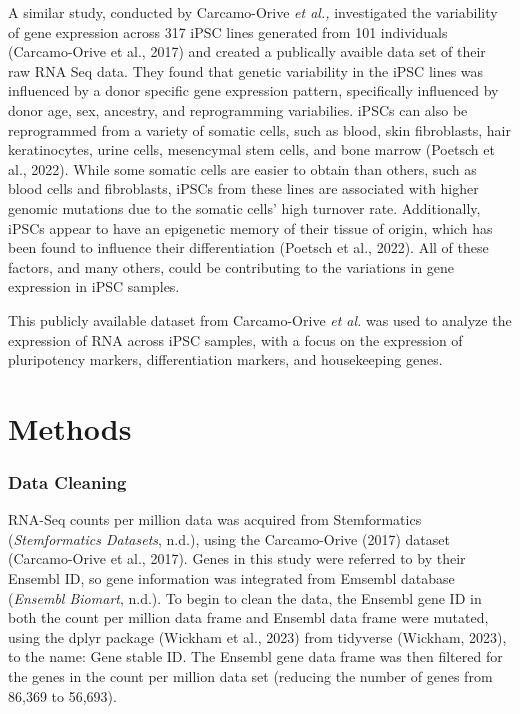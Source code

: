 \documentclass[
  letterpaper,
  DIV=11,
  numbers=noendperiod]{scrartcl}
\begin{document}
A similar study, conducted by Carcamo-Orive \emph{et al.,} investigated
the variability of gene expression across 317 iPSC lines generated from
101 individuals (Carcamo-Orive et al., 2017) and created a publically
avaible data set of their raw RNA Seq data. They found that genetic
variability in the iPSC lines was influenced by a donor specific gene
expression pattern, specifically influenced by donor age, sex, ancestry,
and reprogramming variabilies. iPSCs can also be reprogrammed from a
variety of somatic cells, such as blood, skin fibroblasts, hair
keratinocytes, urine cells, mesencymal stem cells, and bone marrow
(Poetsch et al., 2022). While some somatic cells are easier to obtain
than others, such as blood cells and fibroblasts, iPSCs from these lines
are associated with higher genomic mutations due to the somatic cells'
high turnover rate. Additionally, iPSCs appear to have an epigenetic
memory of their tissue of origin, which has been found to influence
their differentiation (Poetsch et al., 2022). All of these factors, and
many others, could be contributing to the variations in gene expression
in iPSC samples.

This publicly available dataset from Carcamo-Orive \emph{et al.} was
used to analyze the expression of RNA across iPSC samples, with a focus
on the expression of pluripotency markers, differentiation markers, and
housekeeping genes.

\section{Methods}\label{methods}

\subsubsection{Data Cleaning}\label{data-cleaning}

RNA-Seq counts per million data was acquired from Stemformatics
(\emph{Stemformatics Datasets}, n.d.), using the Carcamo-Orive (2017)
dataset (Carcamo-Orive et al., 2017). Genes in this study were referred
to by their Ensembl ID, so gene information was integrated from Emsembl
database (\emph{Ensembl Biomart}, n.d.). To begin to clean the data, the
Ensembl gene ID in both the count per million data frame and Ensembl
data frame were mutated, using the dplyr package (Wickham et al., 2023)
from tidyverse (Wickham, 2023), to the name: Gene stable ID. The Ensembl
gene data frame was then filtered for the genes in the count per million
data set (reducing the number of genes from 86,369 to 56,693).
\end{document}
